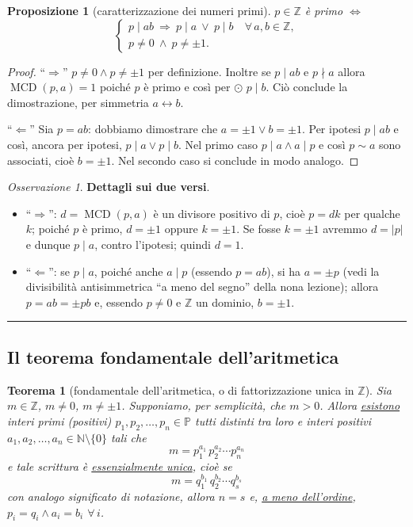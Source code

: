 \documentclass[11pt,a4paper]{article}
\newcommand{\N}{\mathbb{N}}
\newcommand{\Z}{\mathbb{Z}}
\newcommand{\Prim}{\mathbb{P}}
\theoremstyle{definition}
\theoremstyle{plain}
\newtheorem{proposizione}[definizione]{Proposizione}
\newtheorem{teorema}[definizione]{Teorema}
\theoremstyle{remark}
\newtheorem*{osservazione}{Osservazione}
\begin{document}
\begin{proposizione}[caratterizzazione dei numeri primi]
$p\in\Z$ è primo $\iff$
\[
\begin{cases}
p\mid ab\ \Rightarrow\ p\mid a\ \vee\ p\mid b\quad\forall\,a,b\in\Z,\\
p\neq0\ \wedge\ p\neq\pm1 .
\end{cases}
\]
\end{proposizione}

\begin{proof}
``$\Rightarrow$'' $p\neq0\wedge p\neq\pm1$ per definizione. Inoltre se $p\mid ab$ e $p\nmid a$ allora $\operatorname{MCD}(p,a)=1$ poiché $p$ è primo e così per $\odot$ $p\mid b$. Ciò conclude la dimostrazione, per simmetria $a\leftrightarrow b$.

``$\Leftarrow$'' Sia $p=ab$: dobbiamo dimostrare che $a=\pm1\vee b=\pm1$. Per ipotesi $p\mid ab$ e così, ancora per ipotesi, $p\mid a\vee p\mid b$. Nel primo caso $p\mid a\wedge a\mid p$ e così $p\sim a$ sono associati, cioè $b=\pm1$. Nel secondo caso si conclude in modo analogo. \qedhere
\end{proof}

\begin{osservazione}
\textbf{Dettagli sui due versi}. 
\begin{itemize}[nosep]
\item ``$\Rightarrow$'': $d=\operatorname{MCD}(p,a)$ è un divisore positivo di $p$, cioè $p=dk$ per qualche $k$; poiché $p$ è primo, $d=\pm1$ oppure $k=\pm1$. Se fosse $k=\pm1$ avremmo $d=|p|$ e dunque $p\mid a$, contro l'ipotesi; quindi $d=1$.
\item ``$\Leftarrow$'': se $p\mid a$, poiché anche $a\mid p$ (essendo $p=ab$), si ha $a=\pm p$ (vedi la divisibilità antisimmetrica ``a meno del segno'' della nona lezione); allora $p=ab=\pm pb$ e, essendo $p\neq0$ e $\Z$ un dominio, $b=\pm1$.
\end{itemize}
\end{osservazione}

\bigskip\hrule\bigskip

\subsection{Il teorema fondamentale dell'aritmetica}

\begin{teorema}[fondamentale dell'aritmetica, o di fattorizzazione unica in $\Z$]\label{thm:fond}
Sia $m\in\Z$, $m\neq0$, $m\neq\pm1$. Supponiamo, per semplicità, che $m>0$. Allora \underline{esistono} interi primi (positivi) $p_1,p_2,\dots,p_n\in\Prim$ tutti distinti tra loro e interi positivi $a_1,a_2,\dots,a_n\in\N\setminus\{0\}$ tali che
\[
m=p_1^{a_1}\,p_2^{a_2}\cdots p_n^{a_n}
\]
e tale scrittura è \underline{essenzialmente unica}, cioè se
\[
m=q_1^{b_1}\,q_2^{b_2}\cdots q_s^{b_s}
\]
con analogo significato di notazione, allora $n=s$ e, \underline{a meno dell'ordine}, $p_i=q_i\wedge a_i=b_i$ $\forall\,i$.
\end{teorema}
\end{document}
